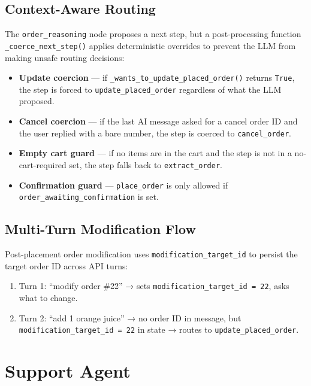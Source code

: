 \documentclass[12pt,a4paper]{report}
\begin{document}
\section{Context-Aware Routing}

The \texttt{order\_reasoning} node proposes a next step, but a post-processing
function \texttt{\_coerce\_next\_step()} applies deterministic overrides to prevent
the LLM from making unsafe routing decisions:

\begin{itemize}
    \item \textbf{Update coercion} — if \texttt{\_wants\_to\_update\_placed\_order()}
          returns \texttt{True}, the step is forced to \texttt{update\_placed\_order}
          regardless of what the LLM proposed.
    \item \textbf{Cancel coercion} — if the last AI message asked for a cancel order ID
          and the user replied with a bare number, the step is coerced to
          \texttt{cancel\_order}.
    \item \textbf{Empty cart guard} — if no items are in the cart and the step is not
          in a no-cart-required set, the step falls back to \texttt{extract\_order}.
    \item \textbf{Confirmation guard} — \texttt{place\_order} is only allowed if
          \texttt{order\_awaiting\_confirmation} is set.
\end{itemize}

\section{Multi-Turn Modification Flow}

Post-placement order modification uses \texttt{modification\_target\_id} to persist
the target order ID across API turns:

\begin{enumerate}
    \item Turn 1: ``modify order \#22'' → sets \texttt{modification\_target\_id = 22},
          asks what to change.
    \item Turn 2: ``add 1 orange juice'' → no order ID in message, but
          \texttt{modification\_target\_id = 22} in state → routes to
          \texttt{update\_placed\_order}.
\end{enumerate}

\chapter{Support Agent}\label{ch:support}
\end{document}
